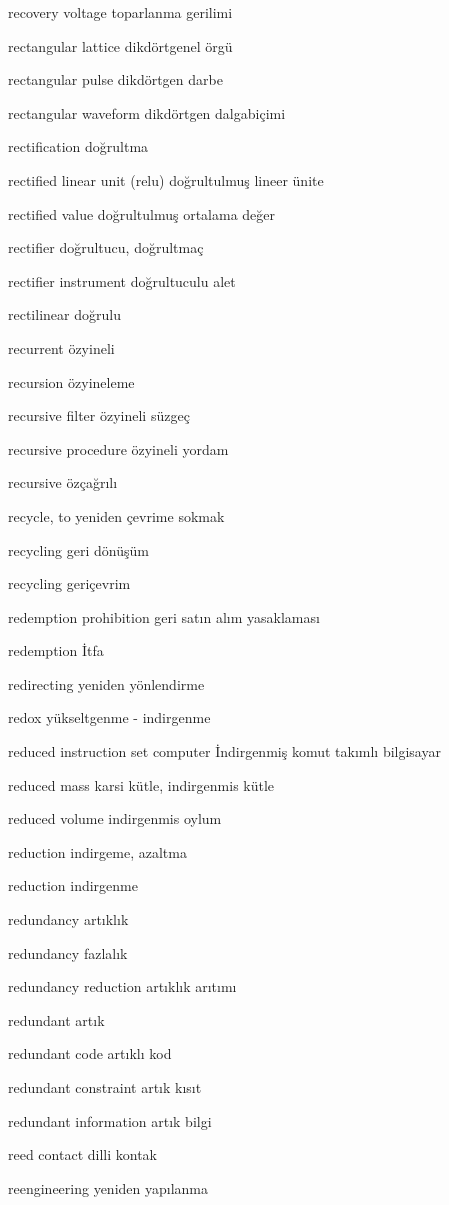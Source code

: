 \documentclass[12pt,fleqn]{article}\usepackage{../../common}
\begin{document}
recovery voltage toparlanma gerilimi

rectangular lattice dikdörtgenel örgü

rectangular pulse dikdörtgen darbe

rectangular waveform dikdörtgen dalgabiçimi

rectification doğrultma

rectified linear unit (relu) doğrultulmuş lineer ünite

rectified value doğrultulmuş ortalama değer

rectifier doğrultucu, doğrultmaç

rectifier instrument doğrultuculu alet

rectilinear doğrulu

recurrent özyineli

recursion özyineleme

recursive filter özyineli süzgeç

recursive procedure özyineli yordam

recursive özçağrılı

recycle, to yeniden çevrime sokmak

recycling geri dönüşüm

recycling geriçevrim

redemption prohibition geri satın alım yasaklaması

redemption İtfa

redirecting yeniden yönlendirme

redox yükseltgenme - indirgenme

reduced instruction set computer İndirgenmiş komut takımlı bilgisayar

reduced mass karsi kütle, indirgenmis kütle

reduced volume indirgenmis oylum

reduction indirgeme, azaltma

reduction indirgenme

redundancy artıklık

redundancy fazlalık

redundancy reduction artıklık arıtımı

redundant artık

redundant code artıklı kod

redundant constraint artık kısıt

redundant information artık bilgi

reed contact dilli kontak

reengineering yeniden yapılanma
\end{document}
